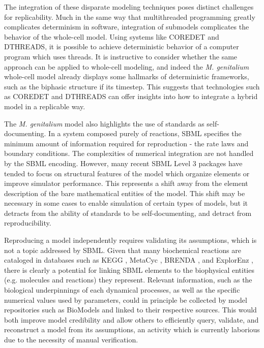 \documentclass[journal,transmag,twoside]{IEEEtran}
\begin{document}
The integration of these disparate modeling techniques poses distinct challenges for replicability.
Much in the same way that multithreaded programming greatly complicates
determinism in software, integration of submodels complicates the behavior
of the whole-cell model.
Using systems like C{\small ORE}D{\small ET} and D{\small THREADS}, it is possible
to achieve deterministic behavior of a computer program which uses threads.
It is instructive to consider whether the same approach can be applied to whole-cell
modeling, and indeed the \textit{M. genitalium} whole-cell model already displays
some hallmarks of deterministic frameworks, such as the biphasic structure if its timestep.
This suggests that technologies such as C{\small ORE}D{\small ET} and D{\small THREADS}
can offer insights into how to integrate a hybrid model in a replicable way.

The \textit{M. genitalium} model also highlights the use of
standards as self-documenting. In a system composed purely of reactions,
SBML specifies the minimum amount of information required for reproduction - the rate laws and
boundary conditions. The complexities of numerical integration are not handled by the SBML encoding.
However, many recent SBML Level 3 packages have tended to focus on
structural features of the model which organize elements or
improve simulator performance.
This represents a shift away from the element description of the bare mathematical
entities of the model. This shift may be necessary in some cases to enable
simulation of certain types of models, but it detracts from the ability
of standards to be self-documenting, and detract from reproducibility.

Reproducing a model independently requires validating its assumptions,
which is not a topic addressed by SBML.
Given that many biochemical reactions are cataloged in databases such as
KEGG \cite{kanehisa2000kegg}, MetaCyc \cite{caspi2008metacyc}, BRENDA \cite{schomburg2002brenda}, and
ExplorEnz \cite{mcdonald2009explorenz}, there is clearly a potential for
linking SBML elements to the biophysical entities (e.g. molecules and reactions) they represent.
Relevant information, such as the biological underpinnings
of each dynamical processes, as well as the specific numerical values used by parameters,
could in principle be collected by model repositories such as BioModels \cite{le2006biomodels}
and linked to their respective sources.
This would both improve model credibility and allow others to efficiently
query, validate, and reconstruct a model from its assumptions,
an activity which is currently laborious due to the necessity of manual verification.
\end{document}
